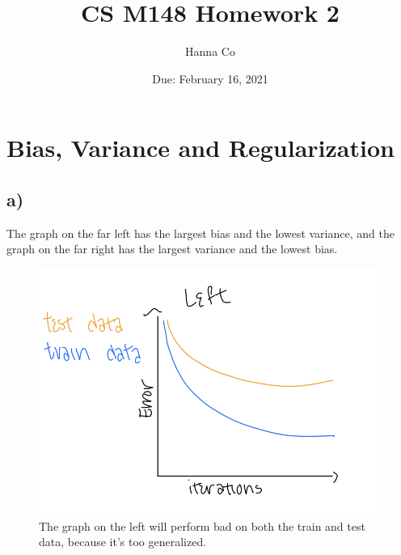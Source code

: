 \documentclass[12pt, letterpaper]{article}
\title{CS M148 Homework 2}
\author{Hanna Co}
\date{Due: February 16, 2021}
\begin{document}
\maketitle
\newpage
\section{Bias, Variance and Regularization}
\subsection*{a)} The graph on the far left has the largest bias and the lowest variance, and the graph on the far right has the largest variance and the lowest bias.
\begin{figure}[h!]
\includegraphics[scale=0.33]{./images/1a_left.jpg}
\caption*{The graph on the left will perform bad on both the train and test data, because it's too generalized.}
\end{figure}
\end{document}
